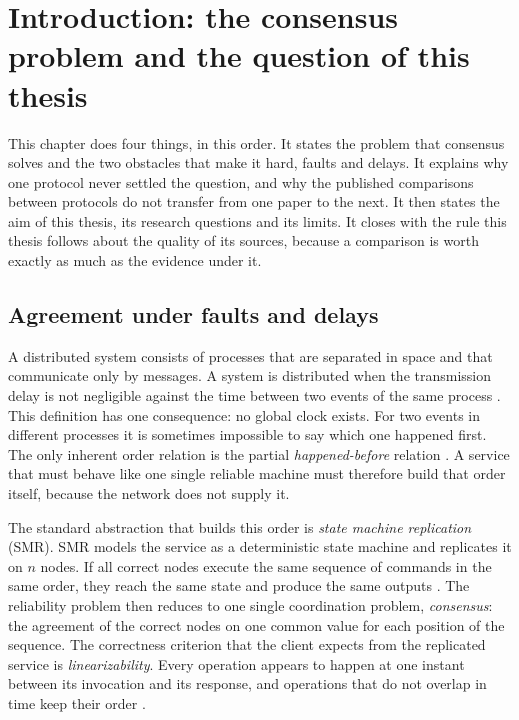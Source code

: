%

\chapter{Introduction: the consensus problem and the question of this thesis}
\label{ch:intro}

This chapter does four things, in this order. It states the problem that
consensus solves and the two obstacles that make it hard, faults and
delays. It explains why one protocol never settled the question, and why
the published comparisons between protocols do not transfer from one
paper to the next. It then states the aim of this thesis, its research
questions and its limits. It closes with the rule this thesis follows
about the quality of its sources, because a comparison is worth exactly
as much as the evidence under it.

\section{Agreement under faults and delays}
\label{sec:problem}

A distributed system consists of processes that are separated in space
and that communicate only by messages. A system is distributed when the
transmission delay is not negligible against the time between two events
of the same process \cite{lamport1978time}. This definition has one
consequence: no global clock exists. For two events in different
processes it is sometimes impossible to say which one happened first.
The only inherent order relation is the partial \emph{happened-before}
relation \cite{lamport1978time}. A service that must behave like one
single reliable machine must therefore build that order itself, because
the network does not supply it.

The standard abstraction that builds this order is \emph{state machine
replication} (SMR). SMR models the service as a deterministic state
machine and replicates it on $n$ nodes. If all correct nodes execute the
same sequence of commands in the same order, they reach the same state
and produce the same outputs \cite{schneider1990implementing}. The
reliability problem then reduces to one single coordination problem,
\emph{consensus}: the agreement of the correct nodes on one common value
for each position of the sequence. The correctness criterion that the
client expects from the replicated service is \emph{linearizability}.
Every operation appears to happen at one instant between its invocation
and its response, and operations that do not overlap in time keep their
order \cite{herlihy1990linearizability}.

